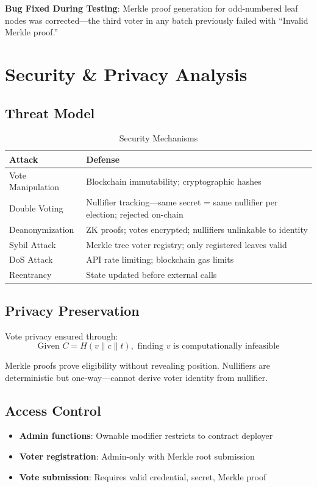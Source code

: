 \documentclass[conference]{IEEEtran}
\begin{document}
\textbf{Bug Fixed During Testing}: Merkle proof generation for odd-numbered leaf nodes was corrected---the third voter in any batch previously failed with ``Invalid Merkle proof.''

\section{Security \& Privacy Analysis}

\subsection{Threat Model}

\begin{table}[htbp]
\caption{Security Mechanisms}
\centering
\begin{tabular}{|p{2.2cm}|p{5.3cm}|}
\hline
\textbf{Attack} & \textbf{Defense} \\
\hline
Vote Manipulation & Blockchain immutability; cryptographic hashes \\
\hline
Double Voting & Nullifier tracking---same secret = same nullifier per election; rejected on-chain \\
\hline
Deanonymization & ZK proofs; votes encrypted; nullifiers unlinkable to identity \\
\hline
Sybil Attack & Merkle tree voter registry; only registered leaves valid \\
\hline
DoS Attack & API rate limiting; blockchain gas limits \\
\hline
Reentrancy & State updated before external calls \\
\hline
\end{tabular}
\end{table}

\subsection{Privacy Preservation}

Vote privacy ensured through:
\begin{equation}
\text{Given } C = H(v \parallel c \parallel t), \text{ finding } v \text{ is computationally infeasible}
\end{equation}

Merkle proofs prove eligibility without revealing position. Nullifiers are deterministic but one-way---cannot derive voter identity from nullifier.

\subsection{Access Control}
\begin{itemize}
    \item \textbf{Admin functions}: Ownable modifier restricts to contract deployer
    \item \textbf{Voter registration}: Admin-only with Merkle root submission
    \item \textbf{Vote submission}: Requires valid credential, secret, Merkle proof
\end{itemize}
\end{document}
